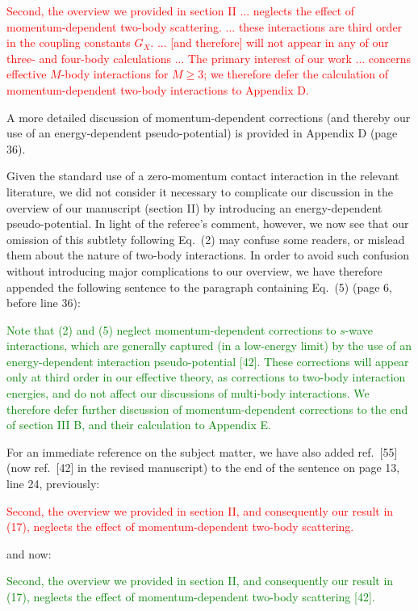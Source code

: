 \documentclass[preprint]{revtex4-1}
\newcommand{\1}{\mathds{1}}
\newcommand{\red}[1]{\textcolor{red}{#1}}
\newcommand{\green}[1]{\textcolor{green}{#1}}
\begin{document}
\begin{enumerate}
  \red{Second, the overview we provided in section II ...  neglects
    the effect of momentum-dependent two-body scattering. ... these
    interactions are third order in the coupling constants $G_X$.
    ... [and therefore] will not appear in any of our three- and
    four-body calculations ... The primary interest of our work
    ... concerns effective $M$-body interactions for $M\ge3$; we
    therefore defer the calculation of momentum-dependent two-body
    interactions to Appendix D.}

  A more detailed discussion of momentum-dependent corrections (and
  thereby our use of an energy-dependent pseudo-potential) is provided
  in Appendix D (page 36).

  Given the standard use of a zero-momentum contact interaction in the
  relevant literature, we did not consider it necessary to complicate
  our discussion in the overview of our manuscript (section II) by
  introducing an energy-dependent pseudo-potential.  In light of the
  referee's comment, however, we now see that our omission of this
  subtlety following Eq.~(2) may confuse some readers, or mislead them
  about the nature of two-body interactions.  In order to avoid such
  confusion without introducing major complications to our overview,
  we have therefore appended the following sentence to the paragraph
  containing Eq.~(5) (page 6, before line 36):

  \green{Note that (2) and (5) neglect momentum-dependent corrections
    to $s$-wave interactions, which are generally captured (in a
    low-energy limit) by the use of an energy-dependent interaction
    pseudo-potential [42].  These corrections will appear only at
    third order in our effective theory, as corrections to two-body
    interaction energies, and do not affect our discussions of
    multi-body interactions.  We therefore defer further discussion of
    momentum-dependent corrections to the end of section III B, and
    their calculation to Appendix E.}

  For an immediate reference on the subject matter, we have also added
  ref.~[55] (now ref.~[42] in the revised manuscript) to the end of
  the sentence on page 13, line 24, previously:

  \red{Second, the overview we provided in section II, and
    consequently our result in (17), neglects the effect of
    momentum-dependent two-body scattering.}

  and now:

  \green{Second, the overview we provided in section II, and
    consequently our result in (17), neglects the effect of
    momentum-dependent two-body scattering [42].}


\end{enumerate}
\end{document}
